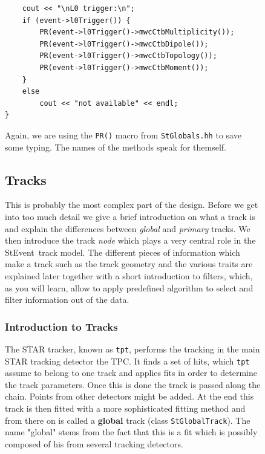 \documentclass[twoside]{article}
\newcommand{\StEvent}{\textsf{StEvent}}
\begin{document}
\begin{figure}[htb]
\begin{center}
\begin{verbatim}
    cout << "\nL0 trigger:\n";
    if (event->l0Trigger()) {
        PR(event->l0Trigger()->mwcCtbMultiplicity());
        PR(event->l0Trigger()->mwcCtbDipole());
        PR(event->l0Trigger()->mwcCtbTopology());
        PR(event->l0Trigger()->mwcCtbMoment());
    }
    else
        cout << "not available" << endl;
}
\end{verbatim}
Again, we are using the \texttt{PR()} macro from \texttt{StGlobals.hh}
to save some typing. The names of the methods speak for themself.

\subsection{Tracks}

This is probably the most complex part of the design.  Before we get
into too much detail we give a brief introduction on what a track is
and explain the differences between \emph{global} and \emph{primary}
tracks. We then introduce the track \emph{node} which plays a very
central role in the \StEvent\ track model.  The different pieces of
information which make a track such as the track geometry and the
various traits are explained later together with a short introduction
to filters, which, as you will learn, allow to apply predefined
algorithm to select and filter information out of the data.

\subsubsection{Introduction to Tracks}
 

The STAR tracker, known as \texttt{tpt}, performs the tracking in the
main STAR tracking detector the TPC. It finds a set of hits, which
\texttt{tpt} assume to belong to one track and applies fits in order
to determine the track parameters. Once this is done the track is
passed along the chain.  Points from other detectors might be added.
At the end this track is then fitted with a more sophisticated fitting
method and from there on is called a \textbf{global} track (class
\texttt{StGlobalTrack}).  The name "global" stems from the fact that
this is a fit which is possibly composed of his from several tracking
detectors.


\end{center}
\end{figure}
\end{document}
